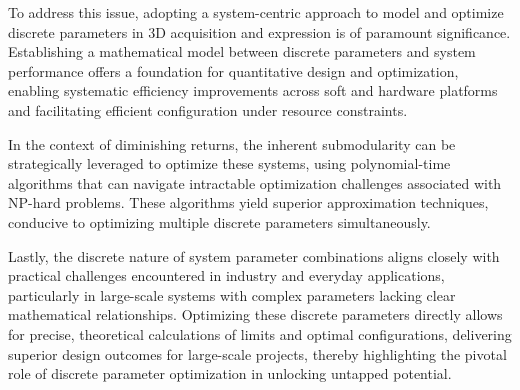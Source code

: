 To address this issue, adopting a system-centric approach to model and optimize discrete parameters in 3D acquisition and expression is of paramount significance. Establishing a mathematical model between discrete parameters and system performance offers a foundation for quantitative design and optimization, enabling systematic efficiency improvements across soft and hardware platforms and facilitating efficient configuration under resource constraints.


In the context of diminishing returns, the inherent submodularity can be strategically leveraged to optimize these systems, using polynomial-time algorithms that can navigate intractable optimization challenges associated with NP-hard problems. These algorithms yield superior approximation techniques, conducive to optimizing multiple discrete parameters simultaneously.


Lastly, the discrete nature of system parameter combinations aligns closely with practical challenges encountered in industry and everyday applications, particularly in large-scale systems with complex parameters lacking clear mathematical relationships. Optimizing these discrete parameters directly allows for precise, theoretical calculations of limits and optimal configurations, delivering superior design outcomes for large-scale projects, thereby highlighting the pivotal role of discrete parameter optimization in unlocking untapped potential.



